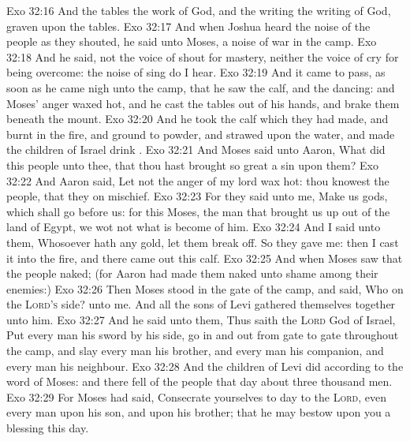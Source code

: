 \vs Exo 32:16 And the tables  the work of God, and the writing  the writing of God, graven upon the tables.
\vs Exo 32:17 And when Joshua heard the noise of the people as they shouted, he said unto Moses,  a noise of war in the camp.
\vs Exo 32:18 And he said,  not the voice of  shout for mastery, neither  the voice of  cry for being overcome:  the noise of  sing do I hear.
\vs Exo 32:19 And it came to pass, as soon as he came nigh unto the camp, that he saw the calf, and the dancing: and Moses' anger waxed hot, and he cast the tables out of his hands, and brake them beneath the mount.
\vs Exo 32:20 And he took the calf which they had made, and burnt  in the fire, and ground  to powder, and strawed  upon the water, and made the children of Israel drink .
\vs Exo 32:21 And Moses said unto Aaron, What did this people unto thee, that thou hast brought so great a sin upon them?
\vs Exo 32:22 And Aaron said, Let not the anger of my lord wax hot: thou knowest the people, that they  on mischief.
\vs Exo 32:23 For they said unto me, Make us gods, which shall go before us: for  this Moses, the man that brought us up out of the land of Egypt, we wot not what is become of him.
\vs Exo 32:24 And I said unto them, Whosoever hath any gold, let them break  off. So they gave  me: then I cast it into the fire, and there came out this calf.
\vs Exo 32:25 And when Moses saw that the people  naked; (for Aaron had made them naked unto  shame among their enemies:)
\vs Exo 32:26 Then Moses stood in the gate of the camp, and said, Who  on the \textsc{Lord's} side?  unto me. And all the sons of Levi gathered themselves together unto him.
\vs Exo 32:27 And he said unto them, Thus saith the \textsc{Lord} God of Israel, Put every man his sword by his side,  go in and out from gate to gate throughout the camp, and slay every man his brother, and every man his companion, and every man his neighbour.
\vs Exo 32:28 And the children of Levi did according to the word of Moses: and there fell of the people that day about three thousand men.
\vs Exo 32:29 For Moses had said, Consecrate yourselves to day to the \textsc{Lord}, even every man upon his son, and upon his brother; that he may bestow upon you a blessing this day.
